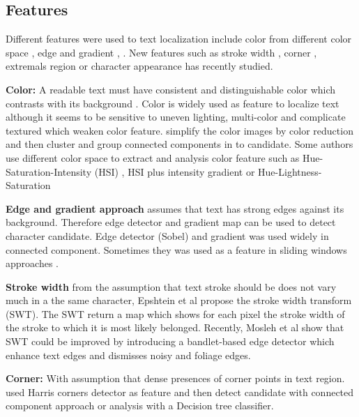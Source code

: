 \subsection{Features}


Different features were used to text localization include color from different color space \cite{yi.2012.TIP} \cite{Roubtsova.2012.SPIE}, edge and gradient \cite{Pillai.2013.ICCPCT}, \cite{Chen.2004.CVPR}. New features such as stroke width \cite{Subramanian.2007.ICDAR} \cite{Epshtein.2010.CVPR} , corner \cite{Zhao.2011.TIP}, extremals region \cite{Neumann.2011.ICDAR} \cite{xucheng.2013.pami} or character appearance \cite{Ye.2014.CBDAR} \cite{Yi.2013.CVIU} has recently studied.


\textbf{Color:} A readable text must have consistent and distinguishable color which contrasts with its background \cite{Liang.2005.IJDAR}. Color is widely used as feature to localize text \cite{Jain.1998.ICPR} \cite{Wang.2003.PR} \cite{Lee.2010.ICPR} although it seems to be sensitive to uneven lighting, multi-color and complicate textured which weaken color feature. \cite{Nikolaou.2009.ISTI} simplify the color images by color reduction and then cluster and group connected components in to candidate. Some authors use different color space to extract and analysis color feature such as Hue-Saturation-Intensity (HSI) \cite{Garcia.2000.ICASSP}, HSI plus intensity gradient \cite{Neumann12} or Hue-Lightness-Saturation \cite{Karatzas.2004.ICPR}


\textbf{Edge and gradient approach} assumes that text has strong edges against its background. Therefore edge detector and gradient map can be used to detect character candidate. Edge detector \cite{Ye.2003.ICICS} (Sobel) \cite{Pillai.2013.ICCPCT} \cite{Shiva.2008.ICPR} and gradient was used widely in connected component. Sometimes they was used as a feature in sliding windows approaches \cite{Chen.2004.CVPR} \cite{Hanif.2008.ICPR}.


\textbf{Stroke width} from the assumption that text stroke should be does not vary much in a the same character, Epshtein et al \cite{Epshtein.2010.CVPR} propose the stroke width transform (SWT). The SWT return a map which shows for each pixel the stroke width of the stroke to which it is most likely belonged. Recently, Mosleh et al \cite{Mosleh.2012.BMVC} show that SWT could be improved by introducing a bandlet-based edge detector which enhance text edges and dismisses noisy and foliage edges.


\textbf{Corner: } With assumption that dense presences of corner points in text region. \cite{Zhao.2011.TIP} \cite{huang.2010.ICPR} used Harris corners detector as feature and then detect candidate with connected component approach \cite{huang.2010.ICPR} or analysis with a Decision tree classifier.


